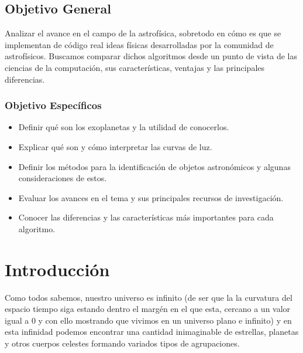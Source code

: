 \documentclass[fleqn, journal]{IEEEtran}                        %
\theoremstyle{break}                                            %
\begin{document}
    \vspace{1em}
    \subsection{Objetivo General}
        
        Analizar el avance en el campo de la astrofísica, sobretodo en cómo es que se implementan de código real
        ideas físicas desarrolladas por la comunidad de astrofísicos. Buscamos comparar dichos algoritmos desde
        un punto de vista de las ciencias de la computación, sus características, ventajas y las principales
        diferencias.


        \subsubsection{Objetivo Específicos}

            \begin{itemize}
                \item Definir qué son los exoplanetas y la utilidad de conocerlos.
                \item Explicar qué son y cómo interpretar las curvas de luz.
                \item Definir los métodos para la identificación de objetos astronómicos y algunas consideraciones de estos.
                \item Evaluar los avances en el tema y sus principales recursos de investigación.
                \item Conocer las diferencias y las características más importantes para cada algoritmo.
            \end{itemize}
            
    \vspace{1em}
    \section{Introducción}
    
        Como todos sabemos, nuestro universo es infinito (de ser que la la curvatura del espacio tiempo siga estando dentro 
        el margén en el que esta, cercano a un valor igual a 0 y con ello mostrando que vivimos en un universo plano e infinito)
        y en esta infinidad podemos encontrar una cantidad inimaginable de estrellas, planetas y otros cuerpos celestes formando
        variados tipos de agrupaciones. 
        
\end{document}
